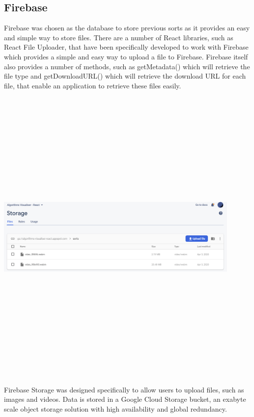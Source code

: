 \newpage
\subsection{Firebase}
Firebase was chosen as the database to store previous sorts as it provides an easy and simple way to store files. There are a number of React libraries, such as React File Uploader, that have been specifically developed to work with Firebase which provides a simple and easy way to upload a file to Firebase. Firebase itself also provides a number of methods, such as getMetadata() which will retrieve the file type and getDownloadURL() which will retrieve the download URL for each file, that enable an application to retrieve these files easily.

\begin{center}
    \includegraphics[width=12cm,height=15cm,keepaspectratio]{images/firestore}
\end{center}

Firebase Storage was designed specifically to allow users to upload files, such as images and videos. Data is stored in a Google Cloud Storage bucket, an exabyte scale object storage solution with high availability and global redundancy.